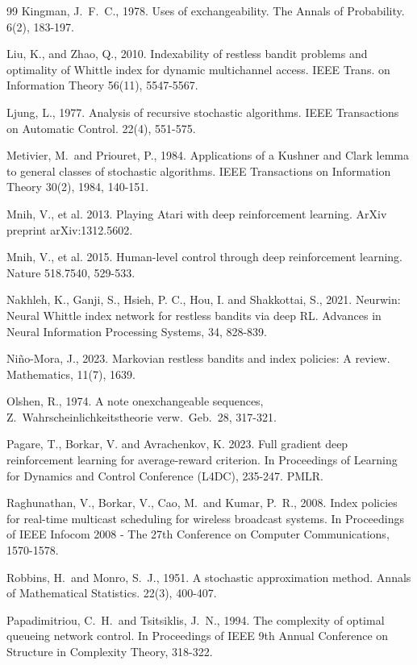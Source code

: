 \documentclass[12pt]{article}
\numberwithin{equation}{section}
\newcommand{\1}{\textbf{1}}
\begin{document}
\begin{thebibliography}{99}
 Kingman, J.\ F.\ C., 1978. Uses of exchangeability. The Annals of Probability. 6(2), 183-197.

 Liu, K., and Zhao, Q., 2010. Indexability of restless bandit problems and optimality of Whittle index for dynamic multichannel access. IEEE Trans. on Information Theory 56(11), 5547-5567.

 Ljung, L., 1977. Analysis of recursive stochastic algorithms. IEEE Transactions on Automatic Control. 22(4), 551-575.

 Metivier, M.\ and Priouret, P.,  1984. Applications of a Kushner and Clark lemma to general classes of stochastic algorithms. IEEE Transactions on Information Theory 30(2), 1984, 140-151.

 Mnih, V., et al. 2013. Playing Atari with deep reinforcement learning. ArXiv preprint arXiv:1312.5602.

 Mnih, V., et al. 2015. Human-level control through deep reinforcement learning. Nature 518.7540, 529-533.

 Nakhleh, K., Ganji, S., Hsieh, P. C., Hou, I. and Shakkottai, S., 2021. 
Neurwin: Neural Whittle index network for restless bandits via deep RL. 
Advances in Neural Information Processing Systems, 34, 828-839.

 Niño-Mora, J., 2023. Markovian restless bandits and index policies: A review. Mathematics, 11(7), 1639.

 Olshen, R., 1974. A note onexchangeable sequences, Z.\ Wahrscheinlichkeitstheorie verw.\ Geb.\ 28, 317-321.

 Pagare, T., Borkar, V. and Avrachenkov, K. 2023. 
Full gradient deep reinforcement learning for average-reward criterion. 
In Proceedings of Learning for Dynamics and Control Conference (L4DC), 235-247. PMLR.

 Raghunathan, V., Borkar, V., Cao, M.\ and Kumar, P.\ R., 2008. Index policies for real-time multicast scheduling for wireless broadcast systems. In Proceedings of IEEE Infocom 2008 - The 27th Conference on Computer Communications, 1570-1578.

 Robbins, H.\ and Monro, S.\ J., 1951.  A stochastic approximation method. Annals of Mathematical Statistics. 22(3), 400-407.

 Papadimitriou, C.\ H.\ and Tsitsiklis, J.\ N., 1994. The complexity of optimal queueing network control. In Proceedings of IEEE 9th Annual Conference on Structure in Complexity Theory, 318-322.


\end{thebibliography}
\end{document}
